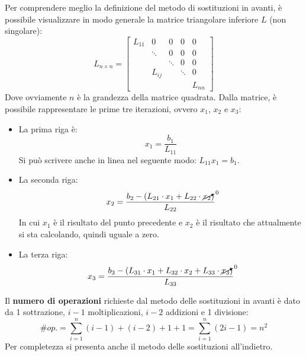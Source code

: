 \noindent
Per comprendere meglio la definizione del metodo di sostituzioni in avanti, è possibile visualizzare in modo generale la matrice triangolare inferiore $L$ (non singolare):
\begin{equation*}
    L_{n \times n} = \begin{bmatrix}
        L_{11} & 0 & 0 & 0 & 0 \\
         & \ddots & 0 & 0 & 0 \\
         & & \ddots & 0 & 0 \\
         & L_{ij} & & \ddots & 0 \\
         & & & & L_{nn}
    \end{bmatrix}
\end{equation*}
Dove ovviamente $n$ è la grandezza della matrice quadrata. Dalla matrice, è possibile rappresentare le prime tre iterazioni, ovvero $x_{1}$, $x_{2}$ e $x_{3}$:
\begin{itemize}
    \item La prima riga è:
    \begin{equation*}
        x_{1} = \dfrac{
            b_{1}
        }{
            L_{11}
        }
    \end{equation*}
    Si può scrivere anche in linea nel seguente modo: $L_{11}x_{1} = b_{1}$.

    \item La seconda riga:
    \begin{equation*}
        x_{2} = \dfrac{
            b_{2} - (L_{21} \cdot x_{1} + L_{22}  \cdot \cancelto{0}{x_{2}})
        }{
            L_{22}
        }
    \end{equation*}
    In cui $x_{1}$ è il risultato del punto precedente e $x_{2}$ è il risultato che attualmente si sta calcolando, quindi uguale a zero.

    \item La terza riga:
    \begin{equation*}
        x_{3} = \dfrac{
            b_{3} - (L_{31} \cdot x_{1} + L_{32} \cdot x_{2} + L_{33} \cdot \cancelto{0}{x_{3}})
        }{
            L_{33}
        }
    \end{equation*}
\end{itemize}

\noindent
Il \textbf{numero di operazioni} richieste dal metodo delle sostituzioni in avanti è dato da 1 sottrazione, $i-1$ moltiplicazioni, $i-2$ addizioni e 1 divisione:
\begin{equation}
    \# op. = \displaystyle\sum_{i=1}^{n} \left(i-1\right) + \left(i-2\right) + 1 + 1 = \sum_{i=1}^{n} \left(2i-1\right) = n^{2}
\end{equation}
Per completezza si presenta anche il metodo delle sostituzioni all'indietro.

